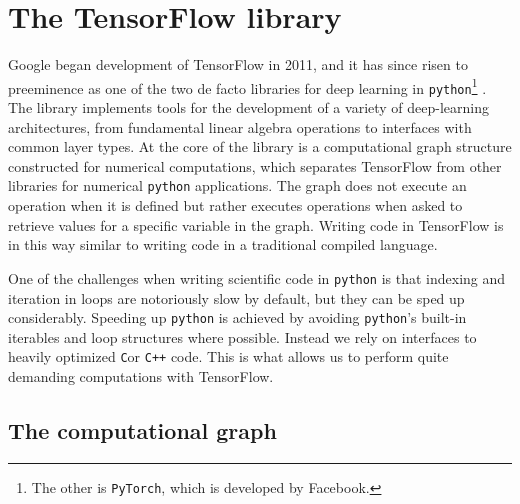 \section{The TensorFlow library}\label{sec:TensorFlow}

Google began development of TensorFlow in 2011, and it has since risen to preeminence as one of the two de facto libraries for deep learning in \lstinline{python}\footnote{The other is \lstinline{PyTorch}, which is developed by Facebook.} \cite{tensorflow}. The library implements tools for the development of a variety of deep-learning architectures, from fundamental linear algebra operations to interfaces with common layer types. At the core of the library is a computational graph structure constructed for numerical computations, which separates TensorFlow from other libraries for numerical \lstinline{python} applications. The graph does not execute an operation when it is defined but rather executes operations when asked to retrieve values for a specific variable in the graph. Writing code in TensorFlow is in this way similar to writing code in a traditional compiled language.

One of the challenges when writing scientific code in \lstinline{python} is that indexing and iteration in loops are notoriously slow by default, but they can be sped up considerably. Speeding up \lstinline{python} is achieved by avoiding \lstinline{python}'s built-in iterables and loop structures where possible. Instead we rely on interfaces to heavily optimized \lstinline{C}or \lstinline{C++} code. This is what allows us to perform quite demanding computations with TensorFlow.

\subsection{The computational graph}

